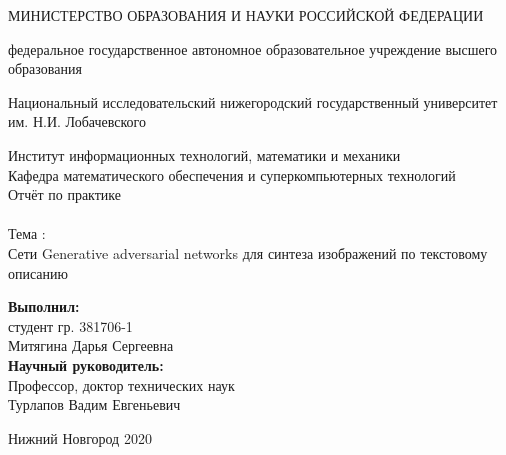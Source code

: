 \documentclass{article}
\begin{document}
    \begin{center} 
    \large МИНИСТЕРСТВО ОБРАЗОВАНИЯ И НАУКИ РОССИЙСКОЙ ФЕДЕРАЦИИ

федеральное государственное автономное образовательное учреждение высшего образования

Национальный исследовательский нижегородский государственный университет им. Н.И. Лобачевского

Институт информационных технологий, математики и механики \\
Кафедра математического обеспечения и суперкомпьютерных технологий\\[3.5cm] 
    
    \huge Отчёт по практике \\[0.6cm] %
    \\ 
    \huge{Тема :}\\[0.6cm]
    \huge Сети Generative adversarial networks для синтеза изображений по текстовому описанию\\[7.7cm]
    
    
    \end{center} 
    
    \begin{flushright}
    \large \textbf{Выполнил:} \\
    студент гр. 381706-1 \\
    Митягина Дарья Сергеевна \\
    \textbf{Научный руководитель:} \\
    Профессор, доктор технических наук\\
    Турлапов Вадим Евгеньевич \\
    [3.7cm]
    \end{flushright}
    
    
    \begin{center} 
    \large Нижний Новгород 2020
    \end{center} 
    
    \thispagestyle{empty}
    \newpage
      \begin{center}
      \end{center}
        \tableofcontents
      
\end{document}
